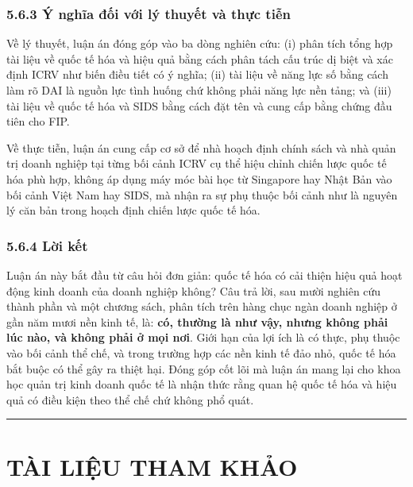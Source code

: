 \documentclass[
  a4paper,
  13pt]{extreport}
\begin{document}
\hypertarget{uxfd-nghux129a-ux111ux1ed1i-vux1edbi-luxfd-thuyux1ebft-vuxe0-thux1ef1c-tiux1ec5n}{%
\subsection{5.6.3 Ý nghĩa đối với lý thuyết và thực
tiễn}\label{uxfd-nghux129a-ux111ux1ed1i-vux1edbi-luxfd-thuyux1ebft-vuxe0-thux1ef1c-tiux1ec5n}}

Về lý thuyết, luận án đóng góp vào ba dòng nghiên cứu: (i) phân tích
tổng hợp tài liệu về quốc tế hóa và hiệu quả bằng cách phân tách cấu
trúc dị biệt và xác định ICRV như biến điều tiết có ý nghĩa; (ii) tài
liệu về năng lực số bằng cách làm rõ DAI là nguồn lực tình huống chứ
không phải năng lực nền tảng; và (iii) tài liệu về quốc tế hóa và SIDS
bằng cách đặt tên và cung cấp bằng chứng đầu tiên cho FIP.

Về thực tiễn, luận án cung cấp cơ sở để nhà hoạch định chính sách và nhà
quản trị doanh nghiệp tại từng bối cảnh ICRV cụ thể hiệu chỉnh chiến
lược quốc tế hóa phù hợp, không áp dụng máy móc bài học từ Singapore hay
Nhật Bản vào bối cảnh Việt Nam hay SIDS, mà nhận ra sự phụ thuộc bối
cảnh như là nguyên lý căn bản trong hoạch định chiến lược quốc tế hóa.

\hypertarget{lux1eddi-kux1ebft}{%
\subsection{5.6.4 Lời kết}\label{lux1eddi-kux1ebft}}

Luận án này bắt đầu từ câu hỏi đơn giản: quốc tế hóa có cải thiện hiệu
quả hoạt động kinh doanh của doanh nghiệp không? Câu trả lời, sau mười
nghiên cứu thành phần và một chương sách, phân tích trên hàng chục ngàn
doanh nghiệp ở gần năm mươi nền kinh tế, là: \textbf{có, thường là như
vậy, nhưng không phải lúc nào, và không phải ở mọi nơi}. Giới hạn của
lợi ích là có thực, phụ thuộc vào bối cảnh thể chế, và trong trường hợp
các nền kinh tế đảo nhỏ, quốc tế hóa bắt buộc có thể gây ra thiệt hại.
Đóng góp cốt lõi mà luận án mang lại cho khoa học quản trị kinh doanh
quốc tế là nhận thức rằng quan hệ quốc tế hóa và hiệu quả có điều kiện
theo thể chế chứ không phổ quát.

\begin{center}\rule{0.5\linewidth}{0.5pt}\end{center}

\newpage

\hypertarget{tuxe0i-liux1ec7u-tham-khux1ea3o}{%
\chapter{TÀI LIỆU THAM KHẢO}\label{tuxe0i-liux1ec7u-tham-khux1ea3o}}
\end{document}
